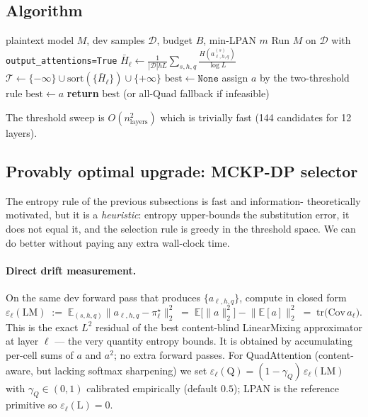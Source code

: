 \documentclass[11pt,a4paper]{article}
\begin{document}
\subsection{Algorithm}
\begin{algorithm}[H]
\caption{\textsc{ComposeForTask}}
\label{alg:selector}
\begin{algorithmic}[1]
\Require plaintext model $M$, dev samples $\mathcal{D}$, budget $B$, min-LPAN $m$
\State Run $M$ on $\mathcal{D}$ with \texttt{output\_attentions=True}
    \State $\bar H_\ell \gets \frac{1}{|\mathcal{D}| h L}\sum_{s,h,q}
            \frac{H(a^{(s)}_{\ell,h,q})}{\log L}$
\EndFor
\State $\mathcal{T} \gets \{-\infty\} \cup \mathrm{sort}(\{\bar H_\ell\}) \cup \{+\infty\}$
\State $\mathrm{best} \gets \texttt{None}$
    \State assign $a$ by the two-threshold rule
            \State $\mathrm{best} \gets a$
        \EndIf
    \EndIf
\EndFor
\State \textbf{return} $\mathrm{best}$ (or all-Quad fallback if infeasible)
\end{algorithmic}
\end{algorithm}

The threshold sweep is $O(n_{\text{layers}}^2)$ which is trivially
fast (144 candidates for 12 layers).

\subsection{Provably optimal upgrade: MCKP-DP selector}
\label{sec:mckp}

The entropy rule of the previous subsections is fast and information-
theoretically motivated, but it is a \emph{heuristic}: entropy
upper-bounds the substitution error, it does not equal it, and the
selection rule is greedy in the threshold space. We can do better
without paying any extra wall-clock time.

\paragraph{Direct drift measurement.}
On the same dev forward pass that produces $\{a_{\ell,h,q}\}$, compute
in closed form
\[
\varepsilon_\ell(\mathrm{LM})
\;:=\; \mathbb{E}_{(s,h,q)}\!\bigl\| a_{\ell,h,q} - \pi^\star_\ell \bigr\|_2^2
\;=\; \mathbb{E}\bigl[\|a\|_2^2\bigr] - \bigl\|\mathbb{E}[a]\bigr\|_2^2
\;=\; \mathrm{tr}\bigl(\mathrm{Cov}\,a_\ell\bigr).
\]
This is the exact $L^2$ residual of the best content-blind LinearMixing
approximator at layer $\ell$ — the very quantity entropy bounds. It is
obtained by accumulating per-cell sums of $a$ and $a^2$; no extra
forward passes. For QuadAttention (content-aware, but lacking softmax
sharpening) we set
$\varepsilon_\ell(\mathrm{Q}) = (1-\gamma_Q)\,\varepsilon_\ell(\mathrm{LM})$
with $\gamma_Q\in(0,1)$ calibrated empirically (default $0.5$); LPAN is
the reference primitive so $\varepsilon_\ell(\mathrm{L})=0$.
\end{document}
